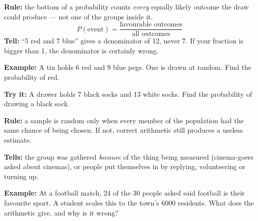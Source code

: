 \documentclass[12pt]{article}
\begin{document}


\begin{formulabox}
\textbf{Rule:} the bottom of a probability counts \emph{every} equally likely
outcome the draw could produce --- not one of the groups inside it.
\[
  P(\text{event}) = \frac{\text{favourable outcomes}}{\text{all outcomes}}
\]
\textbf{Tell:} ``5 red and 7 blue'' gives a denominator of 12, never 7. If your
fraction is bigger than 1, the denominator is certainly wrong.
\end{formulabox}

\begin{examplebox}
\textbf{Example:} \quad A tin holds 6 red and 9 blue pegs. One is drawn at
random. Find the probability of red.
\end{examplebox}

\begin{tryitbox}
\textbf{Try it:} \quad A drawer holds 7 black socks and 13 white socks. Find the
probability of drawing a black sock.\\[2pt]
\end{tryitbox}


\begin{formulabox}
\textbf{Rule:} a sample is random only when every member of the population had
the same chance of being chosen. If not, correct arithmetic still produces a
useless estimate.\par
\textbf{Tells:} the group was gathered \emph{because} of the thing being
measured (cinema-goers asked about cinemas), or people put themselves in by
replying, volunteering or turning up.
\end{formulabox}

\begin{examplebox}
\textbf{Example:} \quad At a football match, 24 of the 30 people asked said
football is their favourite sport. A student scales this to the town's 6000
residents. What does the arithmetic give, and why is it wrong?
\end{examplebox}
\end{document}
